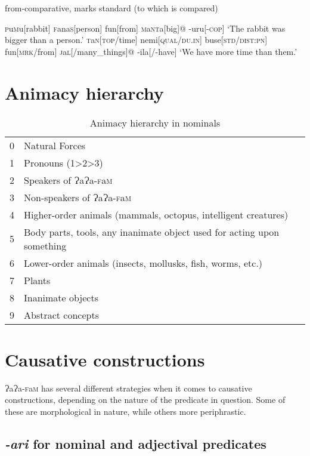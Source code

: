 \documentclass[a4paper,10pt,twoside,openright]{memoir}
\newcommand{\lang}{{\bigglot}a{\bigglot}a-\textsc{f}a\textsc{m}}
\newcommand{\bigglot}{Ɂ}
\newcommand{\famwordold}[5]{#1\textsc{#2}#3\textsc{#4}#5}
\begin{document}
from-comparative, marks standard (to which is compared)

\pex[interpartskip=3ex]
\a
\begingl
\famwordold{}{p}{u}{m}{u}[rabbit]
\famwordold{}{f}{ana}{s}{}[person]
fun[from]
\famwordold{}{m}{a}{nt}{a}[big]@
-uru[\textsc{-cop}]
\glft `The rabbit was bigger than a person.'
\endgl
\a
\begingl
\famwordold{}{t}{a}{n}{}[\textsc{top}/time]
nemi[\textsc{qual}/\textsc{du.in}]
buse[\textsc{std}/\textsc{dist:pn}]
fun[\textsc{mrk}/from]
\famwordold{}{j}{a}{l}{}[/many\_things]@
-ila[/-have]
\glft `We have more time than them.'
\endgl
\xe

\section{Animacy hierarchy}

\begin{table}[ht]
    \centering
    \begin{tabular}{ll}
    0 & Natural Forces \\
    1 & Pronouns (1>2>3) \\
    2 & Speakers of \lang{} \\
    3 & Non-speakers of \lang{} \\
    4 & Higher-order animals (mammals, octopus, intelligent creatures) \\
    5 & \parbox[t]{7cm}{Body parts, tools, any inanimate object used for acting upon something} \\
    6 & Lower-order animals (insects, mollusks, fish, worms, etc.) \\
    7 & Plants \\
    8 & Inanimate objects \\
    9 & Abstract concepts 
    \end{tabular}
    \caption{Animacy hierarchy in nominals}
    \label{tab:hierarchy}
\end{table}

\section{Causative constructions}

\lang{} has several different strategies when it comes to causative constructions, depending on the nature of the predicate in question. Some of these are morphological in nature, while others more periphrastic. 

\subsection{\textit{-ari} for nominal and adjectival predicates}
\end{document}
